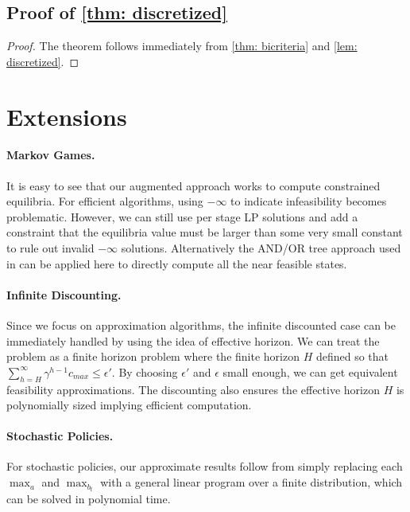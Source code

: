 \documentclass[pdftex, a4paper, 12pt]{article}
\newcommand{\cmax}{c_{max}}
\begin{document}
\subsection{Proof of \texorpdfstring{\cref{thm: discretized}}{thm: discretized}}

\begin{proof}
    The theorem follows immediately from \cref{thm: bicriteria} and \cref{lem: discretized}.
\end{proof}

\section{Extensions}

\paragraph{Markov Games.} It is easy to see that our augmented approach works to compute constrained equilibria. For efficient algorithms, using $-\infty$ to indicate infeasibility becomes problematic. However, we can still use per stage LP solutions and add a constraint that the equilibria value must be larger than some very small constant to rule out invalid $-\infty$ solutions. Alternatively the AND/OR tree approach used in \cite{acMARL} can be applied here to directly compute all the near feasible states. 

\paragraph{Infinite Discounting.}
Since we focus on approximation algorithms, the infinite discounted case can be immediately handled by using the idea of effective horizon. We can treat the problem as a finite horizon problem where the finite horizon $H$ defined so that $\sum_{h = H}^{\infty} \gamma^{h-1} \cmax \leq \epsilon'$. By choosing $\epsilon'$ and $\epsilon$ small enough, we can get equivalent feasibility approximations. The discounting also ensures the effective horizon $H$ is polynomially sized implying efficient computation. 

\paragraph{Stochastic Policies.}
For stochastic policies, our approximate results follow from simply replacing each $\max_{a}$ and $\max_{b_t}$ with a general linear program over a finite distribution, which can be solved in polynomial time. 
\end{document}
